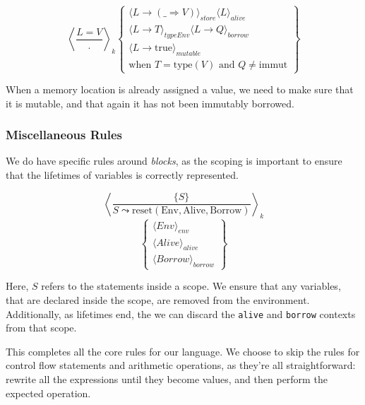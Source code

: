 \documentclass[review,twocolumn]{sigplanconf}
\begin{document}
\begin{small}
  \[
    \left\langle
    \frac{ L = V }{ . }
    \right\rangle _k
    \left\{
    \begin{array}{l}
      \langle L \rightarrow (\_ \Rightarrow V) \rangle_{store} \langle L \rangle_{alive} \\
      \langle L \rightarrow T \rangle_{typeEnv} \langle L \rightarrow Q \rangle_{borrow} \\
      \langle L \rightarrow \text{true} \rangle_{mutable}                                \\
      \text{when } T = \text{type}(V) \text{ and } Q \neq \text{immut}
    \end{array}
    \right\}
  \]
\end{small}

When a memory location is already assigned a value, we need to make sure that it is mutable, and that again it has not been immutably borrowed.

\subsubsection*{Miscellaneous Rules}

We do have specific rules around \textit{blocks}, as the scoping is important to ensure that the lifetimes of variables is correctly represented.

\begin{small}
  \[
    \left\langle
    \frac{ \{ S \} }{ S \leadsto \text{reset}(\text{Env}, \text{Alive}, \text{Borrow}) }
    \right\rangle _k
  \]
  \[
    \left\{
    \begin{array}{l}
      \langle Env \rangle_{env}     \\
      \langle Alive \rangle_{alive} \\
      \langle Borrow \rangle_{borrow}
    \end{array}
    \right\}
  \]
\end{small}

Here, $S$ refers to the statements inside a scope. We ensure that any variables, that are declared inside the scope, are removed from the environment. Additionally, as lifetimes end, the we can discard the \verb!alive! and \verb!borrow! contexts from that scope.

This completes all the core rules for our language. We choose to skip the rules for control flow statements and arithmetic operations, as they're all straightforward: rewrite all the expressions until they become values, and then perform the expected operation.
\end{document}
